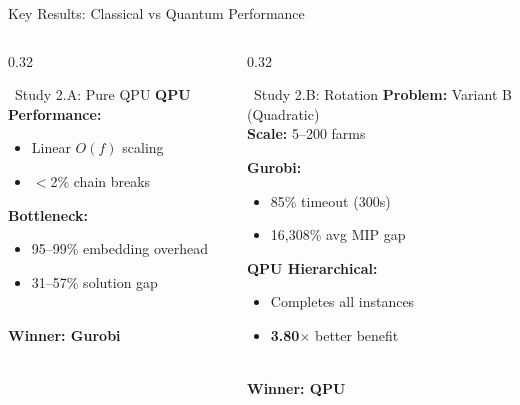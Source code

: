 \documentclass[aspectratio=169,10pt]{beamer}
\begin{document}
\begin{frame}{Key Results: Classical vs Quantum Performance}
\begin{columns}[T]
\begin{column}{0.32\textwidth}
\begin{block}{\centering\small\faMicrochip\ Study 2.A: Pure QPU}
\vspace{0.15cm}
\textbf{\scriptsize QPU Performance:}
\begin{itemize}\tiny
    \item[\textcolor{accentGreen}{\faCheck}] Linear $O(f)$ scaling
    \item[\textcolor{accentGreen}{\faCheck}] $<$2\% chain breaks
\end{itemize}

\textbf{\scriptsize Bottleneck:}
\begin{itemize}\tiny
    \item[\textcolor{alertRed}{\faTimes}] 95--99\% embedding overhead
    \item[\textcolor{warmOrange}{\faTimes}] 31--57\% solution gap
\end{itemize}

\vspace{0.1cm}
\centering
\textcolor{accentGreen}{\large\faTrophy}\\
\tiny\textbf{Winner: Gurobi}
\end{block}
\end{column}

\begin{column}{0.32\textwidth}
\begin{block}{\centering\small\faRocket\ Study 2.B: Rotation}
\vspace{0.1cm}
\textbf{\scriptsize Problem:} Variant B (Quadratic)\\
\textbf{\scriptsize Scale:} 5--200 farms

\vspace{0.15cm}
\textbf{\scriptsize Gurobi:}
\begin{itemize}\tiny
    \item[\textcolor{alertRed}{\faTimes}] 85\% timeout (300s)
    \item[\textcolor{alertRed}{\faTimes}] 16,308\% avg MIP gap
\end{itemize}

\textbf{\scriptsize QPU Hierarchical:}
\begin{itemize}\tiny
    \item[\textcolor{accentGreen}{\faCheck}] Completes all instances
    \item[\textcolor{accentGreen}{\faCheck}] \textbf{3.80$\times$} better benefit
\end{itemize}

\vspace{0.1cm}
\centering
\textcolor{primaryBlue}{\large\faTrophy}\\
\tiny\textbf{Winner: QPU}
\end{block}
\end{column}


\end{columns}
\end{frame}
\end{document}
